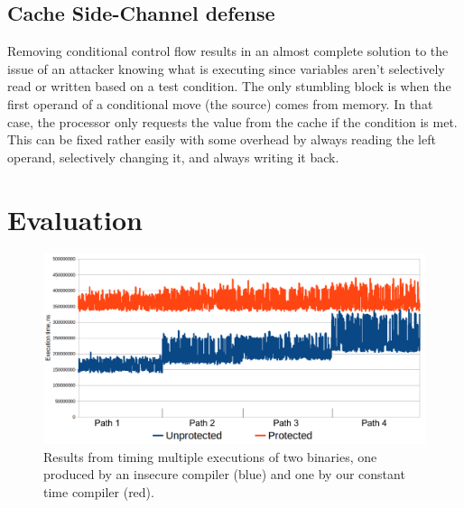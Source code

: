 \documentclass[sigplan, review]{acmart}
\begin{document}
\subsection{Cache Side-Channel defense}
Removing conditional control flow results in an almost complete solution to the issue of an attacker knowing what is executing since variables aren’t selectively read or written based on a test condition. The only stumbling block is when the first operand of a conditional move (the source) comes from memory. In that case, the processor only requests the value from the cache if the condition is met. This can be fixed rather easily with some overhead by always reading the left operand, selectively changing it, and always writing it back.

\section{Evaluation}

\begin{figure}[tp]
\includegraphics[width=\textwidth]{./timings_protected_vs_unprotected.png}
\caption{Results from timing multiple executions of two binaries, one produced by an insecure compiler (blue) and one by our constant time compiler (red).}
\label{fig:timings}
\end{figure}
\end{document}
